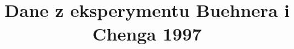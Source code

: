 \documentclass{article}
\title{Dane z eksperymentu Buehnera i Chenga 1997}
\begin{document}

\maketitle{}
\tableofcontents{}
\end{document}
